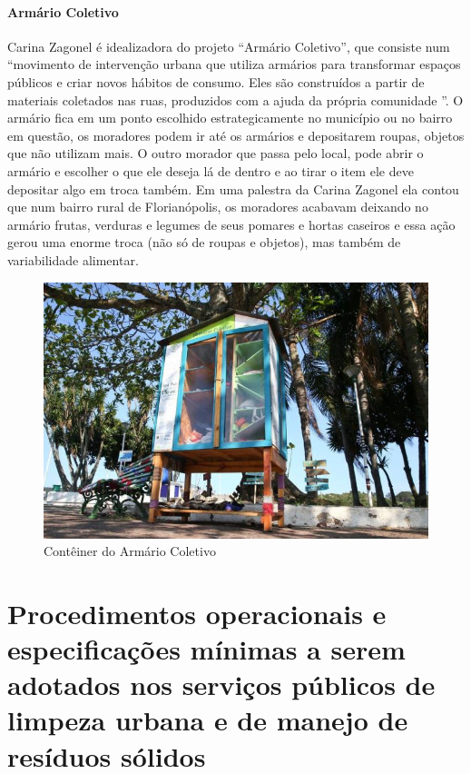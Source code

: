 \paragraph{\textbf{Armário Coletivo}}
Carina Zagonel é idealizadora do projeto “Armário Coletivo”, que consiste num “movimento de intervenção urbana que utiliza armários para transformar espaços públicos e criar novos hábitos de consumo. Eles são construídos a partir de materiais coletados nas ruas, produzidos com a ajuda da própria comunidade ”. O armário fica em um ponto escolhido estrategicamente no município ou no bairro em questão, os moradores podem ir até os armários e depositarem roupas, objetos que não utilizam mais. O outro morador que passa pelo local, pode abrir o armário e escolher o que ele deseja lá de dentro e ao tirar o item ele deve depositar algo em troca também. Em uma palestra da Carina Zagonel ela contou que num bairro rural de Florianópolis, os moradores acabavam deixando no armário frutas, verduras e legumes de seus pomares e hortas caseiros e essa ação gerou uma enorme troca (não só de roupas e objetos), mas também de variabilidade alimentar.

\begin{figure}
	\centering
	\includegraphics[width=0.7\linewidth]{produtos/prodquatro/armario_coletivo}
	\caption{Contêiner do Armário Coletivo}
	\label{fig:armario_coletivo}
\end{figure}


\newpage
\FloatBarrier
\section{Procedimentos operacionais e especificações mínimas a serem adotados nos serviços públicos de limpeza urbana e de manejo de resíduos sólidos}
\label{sec:proc_oper}

